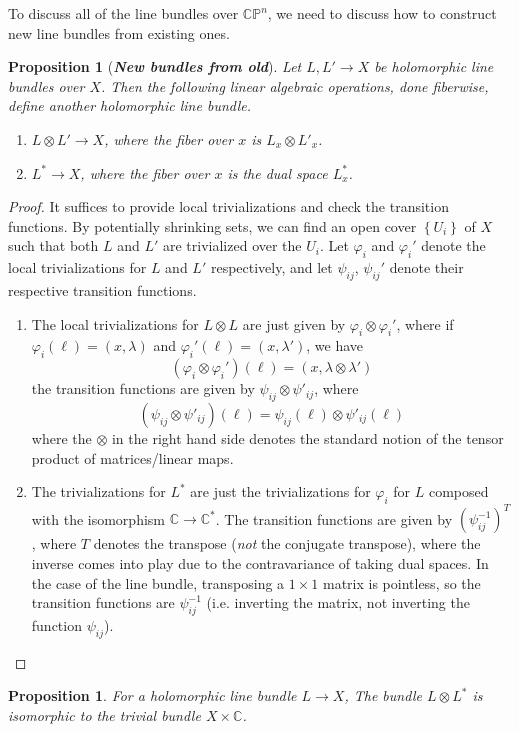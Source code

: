 \documentclass[psamsfonts, 12pt]{amsart}
\newtheorem{prop}[thm]{Proposition}
\theoremstyle{definition}
\theoremstyle{remark}
\newcommand{\ib}[1]{\textbf{\textit{#1}}}
\newcommand{\C}{\mathbb{C}}
\newcommand{\CP}{\mathbb{CP}}
\newcommand{\inv}{^{-1}}
\newcommand{\set}[1]{\left\lbrace #1 \right\rbrace}
\begin{document}
%
To discuss all of the line bundles over $\CP^n$, we need to discuss how to
construct new line bundles from existing ones.
%
\begin{prop}[\ib{New bundles from old}]
Let $L,L'\to X$ be holomorphic line bundles over $X$. Then the following linear algebraic
operations, done fiberwise, define another holomorphic line bundle.
\begin{enumerate}
  \item $L \otimes L' \to X$, where the fiber over $x$ is $L_x \otimes L'_x$.
  \item $L^* \to X$, where the fiber over $x$ is the dual space $L^*_x$.
\end{enumerate}
\end{prop}
%
\begin{proof}
It suffices to provide local trivializations and check the transition functions.
By potentially shrinking sets, we can find an open cover $\set{U_i}$ of $X$
such that both $L$ and $L'$ are trivialized over the $U_i$. Let
$\varphi_i$ and $\varphi_i'$ denote the local trivializations for $L$ and $L'$
respectively, and let $\psi_{ij}$, $\psi_{ij}'$ denote their respective transition
functions.
\begin{enumerate}
  \item The local trivializations for $L \otimes L$ are just given by
  $\varphi_i \otimes \varphi_i'$, where if $\varphi_i(\ell) = (x,\lambda)$
  and $\varphi_i'(\ell) = (x,\lambda')$, we have
  \[
  (\varphi_i \otimes \varphi_i')(\ell) = (x, \lambda \otimes \lambda')
  \]
  the transition functions are given by $\psi_{ij} \otimes \psi'_{ij}$, where
  \[
  (\psi_{ij}\otimes\psi'_{ij})(\ell) = \psi_{ij}(\ell) \otimes \psi'_{ij}(\ell)
  \]
  where the $\otimes$ in the right hand side denotes the standard notion of
  the tensor product of matrices/linear maps.
  \item The trivializations for $L^*$ are just the trivializations
  for $\varphi_i$ for $L$ composed with the isomorphism $\C \to \C^*$. The
  transition functions are given by $(\psi_{ij}\inv)^T$, where $T$ denotes
  the transpose (\emph{not} the conjugate transpose), where the inverse
  comes into play due to the contravariance of taking dual spaces. In the
  case of the line bundle, transposing a $1\times 1$ matrix is pointless, so
  the transition functions are $\psi_{ij}\inv$ (i.e. inverting the matrix,
  not inverting the function $\psi_{ij}$).
\end{enumerate}
\end{proof}
%
\begin{prop}
For a holomorphic line bundle $L \to X$, The bundle $L \otimes L^*$ is isomorphic to
the trivial bundle $X \times \C$.
\end{prop}
\end{document}
